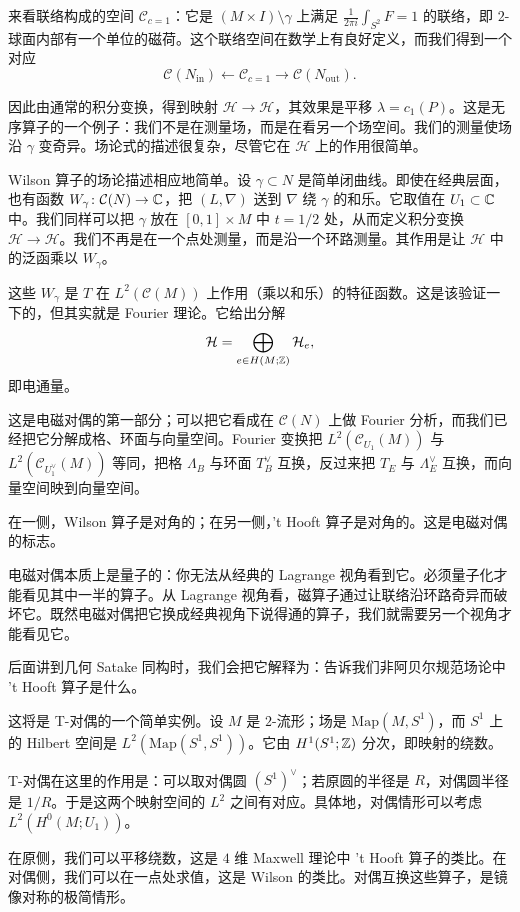 \begin{example}[量子 Maxwell 理论]
  来看联络构成的空间 $\mathcal{C}_{c=1}$：它是 $(M\times I)\setminus\gamma$ 上满足 $\frac{1}{2\pi i}\int_{S^2} F = 1$ 的联络，即 $2$-球面内部有一个单位的磁荷。这个联络空间在数学上有良好定义，而我们得到一个对应
  \[
    \mathcal{C}(N_{\mathrm{in}})\longleftarrow\mathcal{C}_{c=1}\longrightarrow\mathcal{C}(N_{\mathrm{out}}).
  \]

  因此由通常的积分变换，得到映射 $\mathcal{H}\to\mathcal{H}$，其效果是平移 $\lambda = c_1(P)$。这是无序算子的一个例子：我们不是在测量场，而是在看另一个场空间。我们的测量使场沿 $\gamma$ 变奇异。场论式的描述很复杂，尽管它在 $\mathcal{H}$ 上的作用很简单。
\end{example}


Wilson 算子的场论描述相应地简单。设 $\gamma\subset N$ 是简单闭曲线。即使在经典层面，也有函数 $W_\gamma\colon\mathcal{C}(N)\to\mathbb{C}$，把 $(L,\nabla)$ 送到 $\nabla$ 绕 $\gamma$ 的和乐。它取值在 $U_1\subset\mathbb{C}$ 中。我们同样可以把 $\gamma$ 放在 $[0,1]\times M$ 中 $t = 1/2$ 处，从而定义积分变换 $\mathcal{H}\to\mathcal{H}$。我们不再是在一个点处测量，而是沿一个环路测量。其作用是让 $\mathcal{H}$ 中的泛函乘以 $W_\gamma$。

这些 $W_\gamma$ 是 $T$ 在 $L^2(\mathcal{C}(M))$ 上作用（乘以和乐）的特征函数。这是该验证一下的，但其实就是 Fourier 理论。它给出分解
\[
  \mathcal{H} = \bigoplus_{e\in H(M;\mathbb{Z})} \mathcal{H}_e,
\]
即电通量。

这是电磁对偶的第一部分；可以把它看成在 $\mathcal{C}(N)$ 上做 Fourier 分析，而我们已经把它分解成格、环面与向量空间。Fourier 变换把 $L^2(\mathcal{C}_{U_1}(M))$ 与 $L^2(\mathcal{C}_{U_1^\vee}(M))$ 等同，把格 $\Lambda_B$ 与环面 $T_B^\vee$ 互换，反过来把 $T_E$ 与 $\Lambda_E^\vee$ 互换，而向量空间映到向量空间。

在一侧，Wilson 算子是对角的；在另一侧，'t Hooft 算子是对角的。这是电磁对偶的标志。

电磁对偶本质上是量子的：你无法从经典的 Lagrange 视角看到它。必须量子化才能看见其中一半的算子。从 Lagrange 视角看，磁算子通过让联络沿环路奇异而破坏它。既然电磁对偶把它换成经典视角下说得通的算子，我们就需要另一个视角才能看见它。

后面讲到几何 Satake 同构时，我们会把它解释为：告诉我们非阿贝尔规范场论中 't Hooft 算子是什么。

\begin{example}[$d = 2$ 中的阿贝尔对偶]
  这将是 T-对偶的一个简单实例。设 $M$ 是 $2$-流形；场是 $\mathrm{Map}(M,S^1)$，而 $S^1$ 上的 Hilbert 空间是 $L^2(\mathrm{Map}(S^1,S^1))$。它由 $H^1(S^1;\mathbb{Z})$ 分次，即映射的绕数。

  T-对偶在这里的作用是：可以取对偶圆 $(S^1)^\vee$；若原圆的半径是 $R$，对偶圆半径是 $1/R$。于是这两个映射空间的 $L^2$ 之间有对应。具体地，对偶情形可以考虑 $L^2(H^0(M;U_1))$。

  在原侧，我们可以平移绕数，这是 $4$ 维 Maxwell 理论中 't Hooft 算子的类比。在对偶侧，我们可以在一点处求值，这是 Wilson 的类比。对偶互换这些算子，是镜像对称的极简情形。
\end{example}

